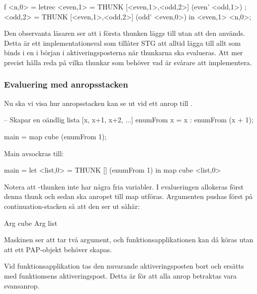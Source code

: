 \documentclass[../Core]{subfiles}
\begin{document}
\begin{codeEx}
f <n,0> = letrec 
    { <even,1> = THUNK [<even,1>,<odd,2>] (even' <odd,1>)
    ; <odd,2>  = THUNK [<even,1>,<odd,2>] (odd' <even,0>)
    } in <even,1> <n,0>;
\end{codeEx}

Den observanta läsaren ser att i första thunken läggs  till utan att den används. 
Detta är ett implementationsval som tillåter STG att alltid lägga till allt som 
binds i en  i början i aktiveringsposterna när thunkarna ska evalueras. 
Att mer precist hålla reda på vilka thunkar som behöver vad är svårare att implementera.




\subsubsection{Evaluering med anropsstacken}


Nu ska vi visa hur anropsstacken kan se ut vid ett anrop till .


\begin{codeEx}
-- Skapar en oändlig lista [x, x+1, x+2, ...]
enumFrom x = x : enumFrom (x + 1);

main = map cube (enumFrom 1);
\end{codeEx}

Main avsockras till:
\begin{codeEx}
main = let <list,0> = THUNK [] (enumFrom 1)
       in  map cube <list,0>
\end{codeEx}



Notera att -thunken inte har några fria variabler.
I evalueringen allokeras först denna thunk och sedan ska anropet till map
utföras. 
Argumenten pushas först på continuation-stacken så att den ser ut såhär:
\begin{codeEx}
Arg cube
Arg list
\end{codeEx}

Maskinen ser att  tar två argument, och funktionsapplikationen 
kan då köras utan att ett PAP-objekt behöver skapas.

Vid funktionsapplikation tas den nuvarande aktiveringsposten bort och ersätts 
med funktionsens aktiveringspost. Detta är för att alla anrop betraktas vara
svansanrop.
\end{document}
